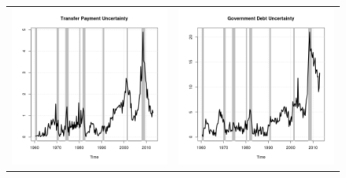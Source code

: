 \documentclass[11pt]{article}
\begin{document}
\begin{figure}
\begin{center}
\begin{tabular}{cc}
\includegraphics[scale=0.45]{./results/pics0.01/fpu_transfers.png} & \includegraphics[scale=0.45]{./results/pics0.01/fpu_debt.png}  
\end{tabular}
\end{center}
\end{figure} 
\end{document}
